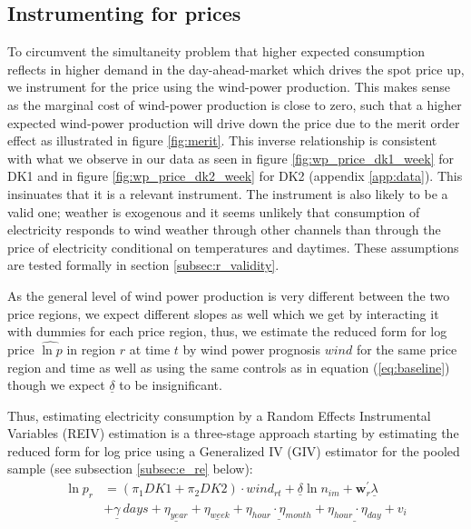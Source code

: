 \subsection{Instrumenting for prices}
\label{subsec:e_instrumenting}
To circumvent the simultaneity problem that higher expected consumption reflects in higher demand in the day-ahead-market which drives the spot price up, we instrument for the price using the wind-power production. This makes sense as the marginal cost of wind-power production is close to zero, such that a higher expected wind-power production will drive down the price due to the merit order effect as illustrated in figure \ref{fig:merit}. This inverse relationship is consistent with what we observe in our data as seen in figure \ref{fig:wp_price_dk1_week} for DK1 and in figure \ref{fig:wp_price_dk2_week} for DK2 (appendix \ref{app:data}). This insinuates that it is a relevant instrument. The instrument is also likely to be a valid one; weather is exogenous and it seems unlikely that consumption of electricity responds to wind weather through other channels than through the price of electricity conditional on temperatures and daytimes. These assumptions are tested formally in section \ref{subsec:r_validity}.
\bigskip\par
As the general level of wind power production is very different between the two price regions, we expect different slopes as well which we get by interacting it with dummies for each price region, thus, we estimate the reduced form for log price $\widehat{\ln p}$ in region $r$ at time $t$ by wind power prognosis $wind$ for the same price region and time as well as using the same controls as in equation (\ref{eq:baseline}) though we expect $\underline{\delta}$ to be insignificant.
\par
Thus, estimating electricity consumption by a Random Effects Instrumental Variables (REIV) estimation is a three-stage approach starting by estimating the reduced form for log price using a Generalized IV (GIV) estimator for the pooled sample (see subsection \ref{subsec:e_re} below):
\begin{equation}
  \label{eq:reduced}
  \begin{split}
    \ln p_{r} &= (\pi_1 DK1+\pi_2 DK2)\cdot wind_{rt} +\underline{\delta}\ln n_{im}+\bm{w}^{'}_{r}\underline{\lambda}\\
  &+\underline{\gamma}\ days+\underline{\eta_{year}}+\underline{\eta_{week}}+\underline{\eta_{hour}\cdot\eta_{month}}+\underline{\eta_{hour}\cdot\eta_{day}}+v_{i}
  \end{split}
\end{equation}
